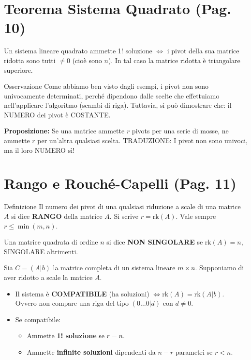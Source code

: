 \section{Teorema Sistema Quadrato (Pag. 10)}

\begin{tcolorbox}[colback=white, colframe=black, title=TEOREMA]
Un sistema lineare quadrato ammette 1! soluzione $\iff$ i pivot della sua matrice ridotta sono tutti $\neq 0$ (cioè sono $n$).
In tal caso la matrice ridotta è triangolare superiore.
\end{tcolorbox}

\begin{note}{Osservazione}{}
Come abbiamo ben visto dagli esempi, i pivot non sono univocamente determinati, perché dipendono dalle scelte che effettuiamo nell'applicare l'algoritmo (scambi di riga).
Tuttavia, si può dimostrare che: il NUMERO dei pivot è COSTANTE.
\end{note}

\textbf{Proposizione:} Se una matrice ammette $r$ pivots per una serie di mosse, ne ammette $r$ per un'altra qualsiasi scelta.
TRADUZIONE: I pivot non sono univoci, ma il loro NUMERO sì!

\section{Rango e Rouché-Capelli (Pag. 11)}

\begin{note}{Definizione}{}
Il numero dei pivot di una qualsiasi riduzione a scale di una matrice $A$ si dice \textbf{RANGO} della matrice $A$.
Si scrive $r = \text{rk}(A)$.
Vale sempre $r \le \min(m, n)$.
\end{note}
Una matrice quadrata di ordine $n$ si dice \textbf{NON SINGOLARE} se $\text{rk}(A)=n$, SINGOLARE altrimenti.

\begin{tcolorbox}[colback=lightBg, colframe=cherryRed, title=TEOREMA DI ROUCHÉ-CAPELLI]
Sia $C=(A|b)$ la matrice completa di un sistema lineare $m \times n$.
Supponiamo di aver ridotto a scale la matrice $A$.
\begin{itemize}
    \item Il sistema è \textbf{COMPATIBILE} (ha soluzioni) $\iff \text{rk}(A) = \text{rk}(A|b)$.
    Ovvero non compare una riga del tipo $(0 \dots 0 | d)$ con $d \neq 0$.
    \item Se compatibile:
    \begin{itemize}
        \item Ammette \textbf{1! soluzione} se $r = n$.
        \item Ammette \textbf{infinite soluzioni} dipendenti da $n-r$ parametri se $r < n$.
    \end{itemize}
\end{itemize}
\end{tcolorbox}

